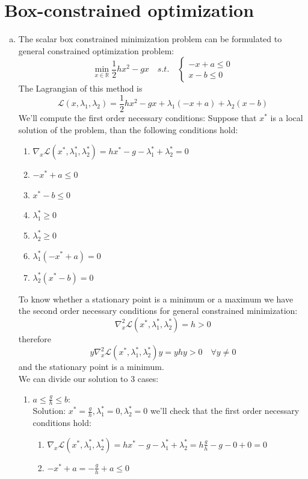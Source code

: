 \documentclass{article}
\begin{document}
\section{Box-constrained optimization}
\begin{enumerate}[(a)]
\item The scalar box constrained minimization problem can be formulated to general constrained optimization problem:
\[\min_{x\in \mathbb{R}}\frac{1}{2}hx^2-gx\quad s.t. \quad
\begin{cases}
-x+a \le 0\\
x-b \le 0
\end{cases}
\]
The Lagrangian of this method is
\[\mathcal{L}(x, \lambda_1, \lambda_2) =  \frac{1}{2}hx^2-gx + \lambda_1(-x+a) + \lambda_2(x-b)\]
We'll compute the first order necessary conditions: Suppose that $x^*$ is a local solution of the problem, than the following conditions hold:
\begin{enumerate}[(1)]
\item $\nabla_x\mathcal{L}(x^*, \lambda_1^*, \lambda_2^*) = hx^*-g -\lambda_1^*+\lambda_2^* = 0$
\item $-x^*+a \le 0$
\item $x^*-b \le 0$
\item $\lambda_1^* \ge 0$
\item $\lambda_2^* \ge 0$
\item $\lambda_1^*(-x^*+a) = 0$
\item $\lambda_2^*(x^*-b) = 0$
\end{enumerate}
To know whether a stationary point is a minimum or a maximum we have the second order necessary conditions for general constrained minimization:
\[\nabla_x^2\mathcal{L}(x^*, \lambda_1^*, \lambda_2^*) = h > 0\]
therefore
\[y\nabla_x^2\mathcal{L}(x^*, \lambda_1^*, \lambda_2^*)y  = yhy> 0 \quad \forall y \ne 0\]
and the stationary point is a minimum.\\
We can divide our solution to 3 cases:
\begin{enumerate}
\item $a \le \frac{g}{h} \le b$:\\
Solution: $x^* =  \frac{g}{h}, \lambda_1^* = 0, \lambda_2^* = 0$
we'll check that the first order necessary conditions hold:
\begin{enumerate}[(1)]
\item $\nabla_x\mathcal{L}(x^*, \lambda_1^*, \lambda_2^*) = hx^*-g -\lambda_1^*+\lambda_2^*  = h\frac{g}{h}-g -0+0 = 0$
\item $-x^*+a  = -\frac{g}{h}+a \le 0$

\end{enumerate}
\end{enumerate}
\end{enumerate}
\end{document}
